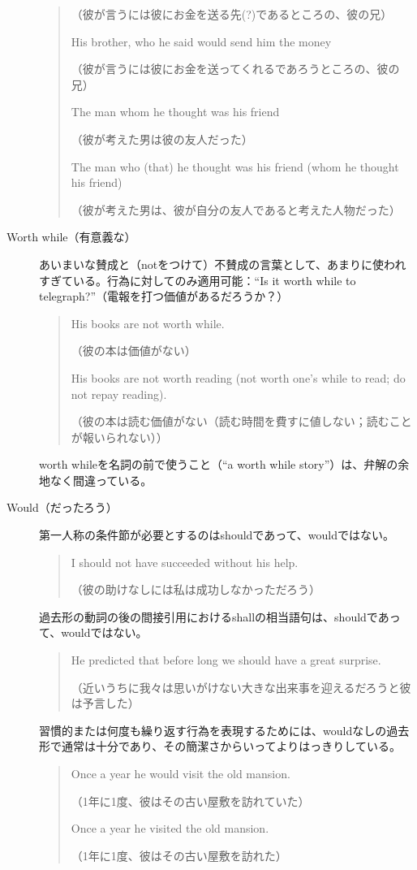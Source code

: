\begin{description}
\begin{quote}
    （彼が言うには彼にお金を送る先(?)であるところの、彼の兄）
    
    His brother, who he said would send him the money
    
    （彼が言うには彼にお金を送ってくれるであろうところの、彼の兄）
    
    The man whom he thought was his friend
    
    （彼が考えた男は彼の友人だった）
    
    The man who (that) he thought was his friend (whom he thought his
friend)

（彼が考えた男は、彼が自分の友人であると考えた人物だった）
\end{quote}
\item[Worth while（有意義な）]あいまいな賛成と（notをつけて）不賛成の言葉として、あまりに使われすぎている。行為に対してのみ適用可能：``Is
it worth while to telegraph?''（電報を打つ価値があるだろうか？）
\begin{quote}
    His books are not worth while.
    
    （彼の本は価値がない）
    
    His books are not worth reading (not worth one's while to read; do
not repay reading).

（彼の本は読む価値がない（読む時間を費すに値しない；読むことが報いられない））
\end{quote}
worth whileを名詞の前で使うこと（``a worth while
story''）は、弁解の余地なく間違っている。
\item[Would（だったろう）]
第一人称の条件節が必要とするのはshouldであって、wouldではない。
\begin{quote}
    I should not have succeeded without his help.
    
    （彼の助けなしには私は成功しなかっただろう）
\end{quote}
過去形の動詞の後の間接引用におけるshallの相当語句は、shouldであって、wouldではない。
\begin{quote}
    He predicted that before long we should have a great surprise.
    
    （近いうちに我々は思いがけない大きな出来事を迎えるだろうと彼は予言した）
\end{quote}
習慣的または何度も繰り返す行為を表現するためには、wouldなしの過去形で通常は十分であり、その簡潔さからいってよりはっきりしている。
\begin{quote}
    Once a year he would visit the old mansion.
    
    （1年に1度、彼はその古い屋敷を訪れていた）
    
    Once a year he visited the old mansion.
    
    （1年に1度、彼はその古い屋敷を訪れた）
\end{quote}
\end{description}
